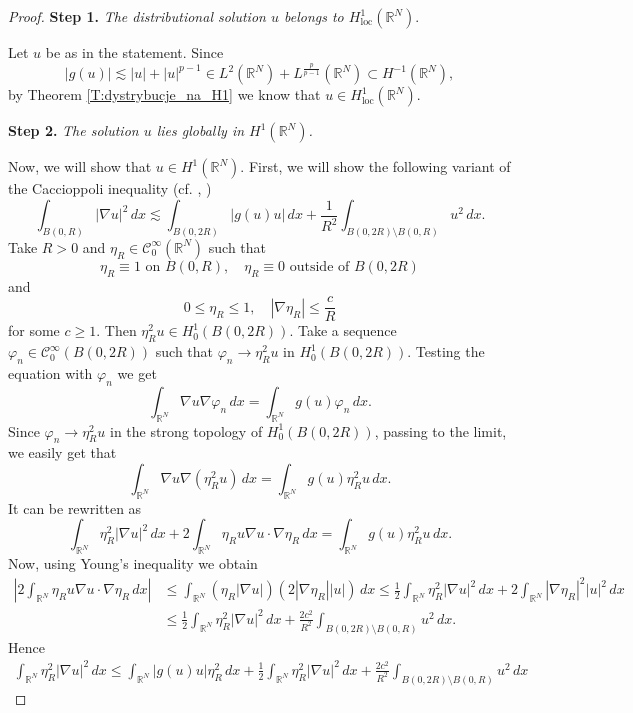 \documentclass[12pt,leqno,twoside,sort]{amsart}
\newcommand{\R}{\mathbb{R}}
\newcommand{\cC}{{\mathcal C}}
\numberwithin{equation}{section}
\newcommand{\loc}{\mathrm{loc}}
\begin{document}
\begin{proof}
\textbf{Step 1.} \textit{The distributional solution $u$ belongs to $H^1_{\loc} (\R^N)$}. 

Let $u$ be as in the statement. Since
\[
|g(u)| \lesssim |u|+|u|^{p-1} \in L^2(\R^N) + L^\frac{p}{p-1} (\R^N) \subset H^{-1} (\R^N),
\]
by Theorem \ref{T:dystrybucje_na_H1} we know that $u \in H^1_{\loc} (\R^N)$.

\textbf{Step 2.} \textit{The solution $u$ lies globally in $H^1 (\R^N)$.}

Now, we will show that $u \in H^1 (\R^N)$. First, we will show the following variant of the Caccioppoli inequality (cf. \cite[Chapter 4]{Giaquinta}, \cite{Iwaniec})
$$
\int_{B(0,R)} |\nabla u|^2 \, dx \lesssim \int_{B(0,2R)} |g(u) u| \, dx + \frac{1}{R^2} \int_{B(0,2R) \setminus B(0,R)} u^2 \, dx.
$$
Take $R > 0$ and $\eta_R \in \cC_0^\infty (\R^N)$ such that
$$
\eta_R \equiv 1 \mbox{ on } B(0,R), \quad \eta_R \equiv 0 \mbox{ outside of } B(0,2R)
$$
and
$$
0 \leq \eta_R \leq 1, \quad |\nabla \eta_R | \leq \frac{c}{R}
$$
for some $c \geq 1$. Then $\eta_R^2 u \in H^1_0 (B(0,2R))$. Take a sequence $\varphi_n \in \cC_0^\infty (B(0,2R))$ such that $\varphi_n \to \eta_R^2 u$ in $H^1_0(B(0,2R))$. Testing the equation with $\varphi_n$ we get
$$
\int_{\R^N} \nabla u \nabla \varphi_n \, dx = \int_{\R^N} g(u) \varphi_n \, dx.
$$
Since $\varphi_n \to \eta_R^2 u$ in the strong topology of $H^1_0(B(0,2R))$, passing to the limit, we easily get that
$$
\int_{\R^N} \nabla u \nabla (\eta_R^2 u) \, dx = \int_{\R^N} g(u) \eta_R^2 u \, dx.
$$
It can be rewritten as
$$
\int_{\R^N} \eta_R^2 |\nabla u|^2 \, dx + 2 \int_{\R^N} \eta_R u \nabla u \cdot \nabla \eta_R \, dx = \int_{\R^N} g(u) \eta_R^2 u \, dx.
$$
Now, using Young's inequality we obtain
\begin{align*}
\left| 2 \int_{\R^N} \eta_R u \nabla u \cdot \nabla \eta_R \, dx \right| &\leq  \int_{\R^N} (\eta_R |\nabla u|) (2| \nabla \eta_R| |u|) \, dx  \leq \frac{1}{2} \int_{\R^N} \eta_R^2 |\nabla u|^2 \, dx + 2 \int_{\R^N} |\nabla \eta_R|^2 |u|^2 \, dx \\
&\leq \frac12 \int_{\R^N} \eta_R^2 |\nabla u|^2 \, dx + \frac{2c^2}{R^2} \int_{B(0,2R) \setminus B(0,R)} u^2 \, dx.
\end{align*}
Hence
\begin{align*}
\int_{\R^N} \eta_R^2 |\nabla u|^2 \, dx \leq \int_{\R^N} |g(u) u| \eta_R^2 \, dx + \frac12 \int_{\R^N} \eta_R^2 |\nabla u|^2 \, dx + \frac{2c^2}{R^2} \int_{B(0,2R) \setminus B(0,R)} u^2 \, dx
\end{align*}

\end{proof}
\end{document}
